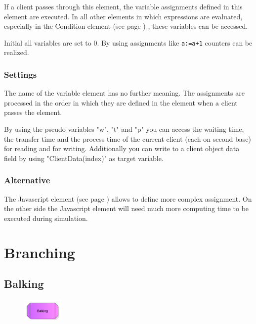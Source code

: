 If a client passes through this element, the variable assignments defined in
this element are executed. In all other elements in which expressions are evaluated,
especially in the Condition element (see page \pageref{ref:ModelElementHold}) , these variables can be accessed.

Initial all variables are set to 0. By using assignments like \texttt{a:=a+1} counters can be realized.

\subsection*{Settings}

The name of the variable element has no further meaning.
The assignments are processed in the order in which they are defined in the element when a client passes the element.

By using the pseudo variables "w", "t" and "p" you can access the waiting time, the transfer time and the
process time of the current client (each on second base) for reading and for writing. Additionally you can
write to a client object data field by using "ClientData(index)" as target variable.

\subsection*{Alternative}

The Javascript element (see page \pageref{ref:ModelElementSetJS}) allows to define more complex assignment.
On the other side the Javascript element will need much more computing time to be executed during simulation.





\chapter{Branching}

\section{Balking}
\label{ref:ModelElementBalking}

\begin{figure}
\vspace{-22pt}
\includegraphics[width=2cm]{imageModelElementBalking.png}
\vspace{-22pt}
\end{figure}

